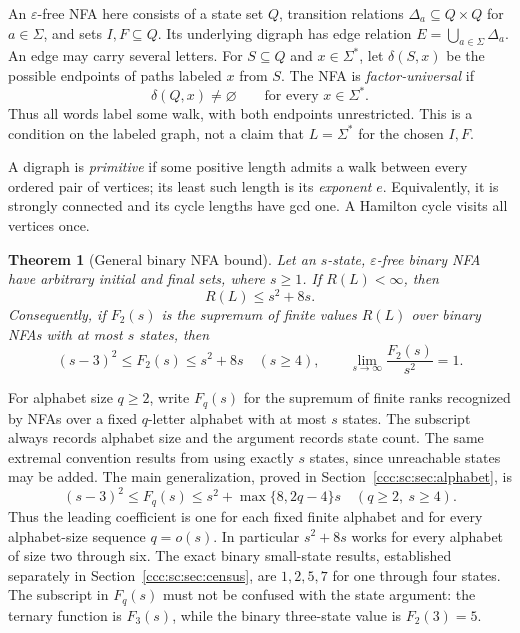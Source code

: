 \documentclass[11pt,letterpaper]{article}
\newtheorem{theorem}{Theorem}[section]
\theoremstyle{definition}
\theoremstyle{remark}
\newcommand{\eps}{\varepsilon}
\begin{document}
An $\eps$-free NFA here consists of a state set $Q$, transition relations $\Delta_a\subseteq Q\times Q$ for $a\in\Sigma$, and sets $I,F\subseteq Q$. Its underlying digraph has edge relation $E=\bigcup_{a\in\Sigma}\Delta_a$. An edge may carry several letters. For $S\subseteq Q$ and $x\in\Sigma^*$, let $\delta(S,x)$ be the possible endpoints of paths labeled $x$ from $S$.
The NFA is \emph{factor-universal} if
\[
 \delta(Q,x)\ne\varnothing\qquad\text{for every }x\in\Sigma^*.
\]
Thus all words label some walk, with both endpoints unrestricted. This is a condition on the labeled graph, not a claim that $L=\Sigma^*$ for the chosen $I,F$.

A digraph is \emph{primitive} if some positive length admits a walk between every ordered pair of vertices; its least such length is its \emph{exponent} $e$. Equivalently, it is strongly connected and its cycle lengths have gcd one. A Hamilton cycle visits all vertices once.

\begin{theorem}[General binary NFA bound]\label{ccc:sc:thm:general}
Let an $s$-state, $\varepsilon$-free binary NFA have arbitrary initial and final sets, where $s\ge1$. If $R(L)<\infty$, then
\[
 \boxed{R(L)\le s^2+8s.}
\]
Consequently, if $F_2(s)$ is the supremum of finite values $R(L)$ over binary NFAs with at most $s$ states, then
\begin{equation}\label{ccc:sc:eq:sharp}
 (s-3)^2\le F_2(s)\le s^2+8s\quad(s\ge4),
 \qquad \boxed{\lim_{s\to\infty}\frac{F_2(s)}{s^2}=1.}
\end{equation}
\end{theorem}

For alphabet size $q\ge2$, write $F_q(s)$ for the supremum of finite ranks recognized by NFAs over a fixed $q$-letter alphabet with at most $s$ states. The subscript always records alphabet size and the argument records state count. The same extremal convention results from using exactly $s$ states, since unreachable states may be added. The main generalization, proved in Section~\ref{ccc:sc:sec:alphabet}, is
\begin{equation}\label{ccc:sc:eq:main-alphabets}
 \boxed{(s-3)^2\le F_q(s)\le s^2+\max\{8,2q-4\}s\quad(q\ge2,\ s\ge4).}
\end{equation}
Thus the leading coefficient is one for each fixed finite alphabet and for every alphabet-size sequence $q=o(s)$. In particular $s^2+8s$ works for every alphabet of size two through six. The exact binary small-state results, established separately in Section~\ref{ccc:sc:sec:census}, are $1,2,5,7$ for one through four states. The subscript in $F_q(s)$ must not be confused with the state argument: the ternary function is $F_3(s)$, while the binary three-state value is $F_2(3)=5$.
\end{document}

